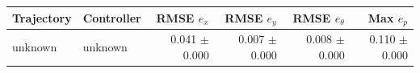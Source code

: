 \begin{tabular}{llrrrr}
\hline
Trajectory & Controller & RMSE $e_x$ & RMSE $e_y$ & RMSE $e_\theta$ & Max $e_p$ \\
\hline
unknown & unknown & 0.041 $\pm$ 0.000 & 0.007 $\pm$ 0.000 & 0.008 $\pm$ 0.000 & 0.110 $\pm$ 0.000 \\
\hline
\end{tabular}
